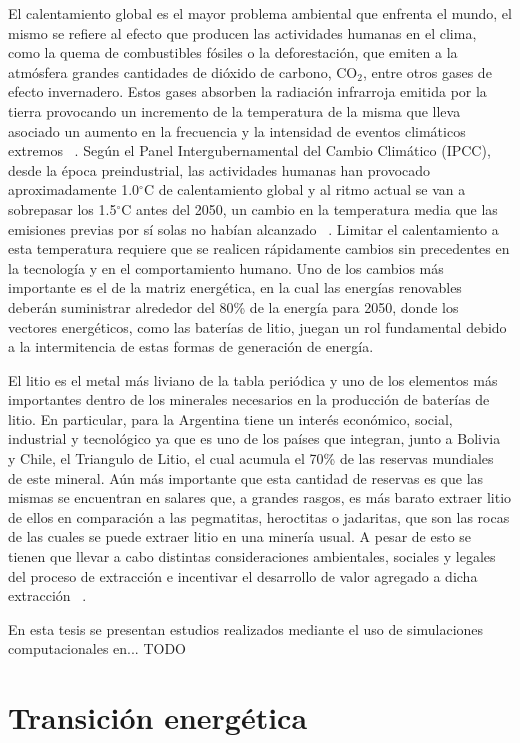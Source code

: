 El calentamiento global es el mayor problema ambiental que enfrenta el mundo, el 
mismo se refiere al efecto que producen las actividades humanas en el clima, como 
la quema de combustibles fósiles o la deforestación, que emiten a la atmósfera
grandes cantidades de dióxido de carbono, CO$_2$, entre otros gases de efecto 
invernadero. Estos gases absorben la radiación infrarroja emitida por la tierra 
provocando un incremento de la temperatura de la misma que lleva asociado un 
aumento en la frecuencia y la intensidad de eventos climáticos extremos 
~\cite{houghton2005}. Según el Panel Intergubernamental del Cambio Climático 
(IPCC), desde la época preindustrial, las actividades humanas han provocado 
aproximadamente 1.0$^{\circ}$C de calentamiento global y al ritmo actual se van 
a sobrepasar los 1.5$^{\circ}$C antes del 2050, un cambio en la temperatura
media que las emisiones previas por sí solas no habían alcanzado
~\cite{harvey2018}. Limitar el calentamiento a esta temperatura requiere que se 
realicen rápidamente cambios sin precedentes en la tecnología y en el 
comportamiento humano. Uno de los cambios más importante es el de la matriz 
energética, en la cual las energías renovables deberán suministrar alrededor del 
80\% de la energía para 2050, donde los vectores energéticos, como las baterías 
de litio, juegan un rol fundamental debido a la intermitencia de estas formas de 
generación de energía.

El litio es el metal más liviano de la tabla periódica y uno de los elementos más
importantes dentro de los minerales necesarios en la producción de baterías de
litio. En particular, para la Argentina tiene un interés económico, social, 
industrial y tecnológico ya que es uno de los países que integran, junto a 
Bolivia y Chile, el Triangulo de Litio, el cual acumula el 70\% de las reservas 
mundiales de este mineral. Aún más importante que esta cantidad de reservas es 
que las mismas se encuentran en salares que, a grandes rasgos, es más barato
extraer litio de ellos en comparación a las pegmatitas, heroctitas o jadaritas, 
que son las rocas de las cuales se puede extraer litio en una minería usual.
A pesar de esto se tienen que llevar a cabo distintas consideraciones ambientales,
sociales y legales del proceso de extracción e incentivar el desarrollo de valor
agregado a dicha extracción ~\cite{heredia2020}.

En esta tesis se presentan estudios realizados mediante el uso de simulaciones 
computacionales en... TODO

\section{Transición energética}

